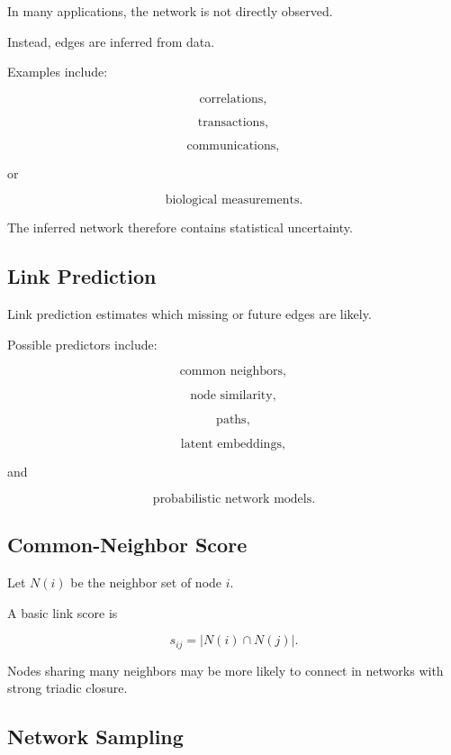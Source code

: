 In many applications, the network is not directly observed.

Instead, edges are inferred from data.

Examples include:

\[
\boxed{
\text{correlations},
}
\]

\[
\boxed{
\text{transactions},
}
\]

\[
\boxed{
\text{communications},
}
\]

or

\[
\boxed{
\text{biological measurements}.
}
\]

The inferred network therefore contains statistical uncertainty.

\subsection{Link Prediction}
\label{subsec:link-prediction}

Link prediction estimates which missing or future edges are likely.

Possible predictors include:

\[
\boxed{
\text{common neighbors},
}
\]

\[
\boxed{
\text{node similarity},
}
\]

\[
\boxed{
\text{paths},
}
\]

\[
\boxed{
\text{latent embeddings},
}
\]

and

\[
\boxed{
\text{probabilistic network models}.
}
\]

\subsection{Common-Neighbor Score}
\label{subsec:common-neighbor-score}

Let \(N(i)\) be the neighbor set of node \(i\).

A basic link score is

\[
\boxed{
s_{ij}
=
|N(i)\cap N(j)|.
}
\]

Nodes sharing many neighbors may be more likely to connect in networks with
strong triadic closure.

\subsection{Network Sampling}
\label{subsec:network-sampling}

